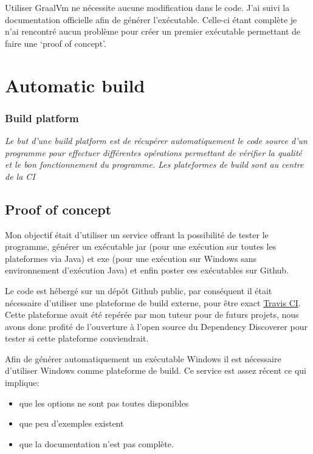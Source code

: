 \documentclass[french,a4paper,12pt]{report}
\begin{document}
Utiliser GraalVm ne nécessite aucune modification dans le code. J’ai suivi la documentation officielle afin de générer l’exécutable. Celle-ci étant complète je n’ai rencontré aucun problème pour créer un premier exécutable permettant de faire une ‘proof of concept’.


\section{Automatic build}

\subsubsection{Build platform}

\textit{Le but d’une build platform est de récupérer automatiquement le code source d’un programme pour effectuer différentes opérations permettant de vérifier la qualité et le bon fonctionnement du programme. Les plateformes de build sont au centre de la CI}

\subsection{Proof of concept}

Mon objectif était d'utiliser un service offrant la possibilité de tester le programme, générer un exécutable jar (pour une exécution sur toutes les plateformes via Java) et exe (pour une exécution sur Windows sans environnement d’exécution Java) et enfin poster ces exécutables sur Github. 

Le code est hébergé sur un dépôt Github public, par conséquent il était nécessaire d’utiliser une plateforme de build externe, pour être exact \href{https://travis-ci.com/}{Travis CI}. Cette plateforme avait été repérée par mon tuteur pour de futurs projets, nous avons donc profité de l'ouverture à l'open source du Dependency Discoverer pour tester si cette plateforme conviendrait.

Afin de générer automatiquement un exécutable Windows il est nécessaire d’utiliser Windows comme plateforme de build. Ce service est assez récent ce qui implique:

\begin{itemize}

 \item que les options ne sont pas toutes disponibles
 \item que peu d’exemples existent
 \item que la documentation n’est pas complète.

\end{itemize}
\end{document}
